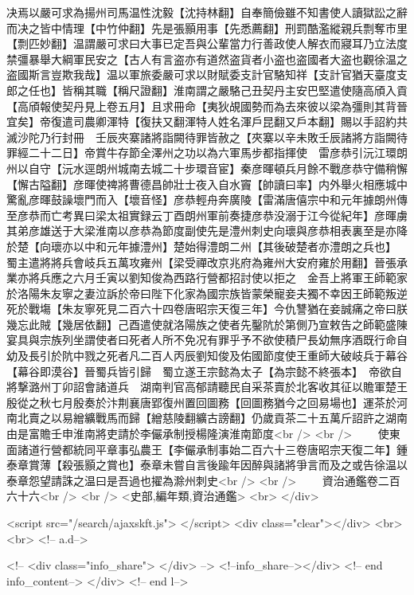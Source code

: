决焉以嚴可求為揚州司馬温性沈毅【沈持林翻】自奉簡儉雖不知書使人讀獄訟之辭而决之皆中情理【中竹仲翻】先是張顥用事【先悉薦翻】刑罰酷濫縱親兵剽奪市里【剽匹妙翻】温謂嚴可求曰大事已定吾與公輩當力行善政使人解衣而寢耳乃立法度禁彊暴舉大綱軍民安之【古人有言盗亦有道然盗貨者小盗也盗國者大盗也觀徐温之盗國斯言豈欺我哉】温以軍旅委嚴可求以財賦委支計官駱知祥【支計官猶天臺度支郎之任也】皆稱其職【稱尺證翻】淮南謂之嚴駱己丑契丹主安巴堅遣使隨高頎入貢【高頎報使契丹見上卷五月】且求冊命【夷狄覘國勢而為去來彼以梁為彊則其背晉宜矣】帝復遣司農卿渾特【復扶又翻渾特人姓名渾戶昆翻又戶本翻】賜以手詔約共滅沙陀乃行封冊　壬辰夾寨諸將詣闕待罪皆赦之【夾寨以辛未敗壬辰諸將方詣闕待罪經二十二日】帝賞牛存節全澤州之功以為六軍馬步都指揮使　雷彦恭引沅江環朗州以自守【沅水逕朗州城南去城二十步環音宦】秦彦暉頓兵月餘不戰彦恭守備稍懈【懈古隘翻】彦暉使禆將曹德昌帥壯士夜入自水竇【帥讀曰率】内外舉火相應城中驚亂彦暉鼓譟壞門而入【壞音怪】彦恭輕舟奔廣陵【雷滿唐僖宗中和元年據朗州傳至彦恭而亡考異曰梁太祖實録云丁酉朗州軍前奏捷彦恭没溺于江今從紀年】彦暉虜其弟彦雄送于大梁淮南以彦恭為節度副使先是澧州刺史向瓌與彦恭相表裏至是亦降於楚【向瓌亦以中和元年據澧州】楚始得澧朗二州【其後破楚者亦澧朗之兵也】　蜀主遣將將兵會岐兵五萬攻雍州【梁受禪改京兆府為雍州大安府雍於用翻】晉張承業亦將兵應之六月壬寅以劉知俊為西路行營都招討使以拒之　金吾上將軍王師範家於洛陽朱友寧之妻泣訴於帝曰陛下化家為國宗族皆蒙榮寵妾夫獨不幸因王師範叛逆死於戰塲【朱友寧死見二百六十四卷唐昭宗天復三年】今仇讐猶在妾誠痛之帝曰朕幾忘此賊【幾居依翻】己酉遣使就洛陽族之使者先鑿阬於第側乃宣敕告之師範盛陳宴具與宗族列坐謂使者曰死者人所不免况有罪乎予不欲使積尸長幼無序酒既行命自幼及長引於阬中戮之死者凡二百人丙辰劉知俊及佑國節度使王重師大破岐兵于幕谷【幕谷即漠谷】晉蜀兵皆引歸　蜀立遂王宗懿為太子【為宗懿不終張本】　帝欲自將撃潞州丁卯詔會諸道兵　湖南判官高郁請聽民自采茶賣於北客收其征以贍軍楚王殷從之秋七月殷奏於汴荆襄唐郢復州置回圖務【回圖務猶今之回易場也】運茶於河南北賣之以易繒纊戰馬而歸【繒慈陵翻纊古謗翻】仍歲貢茶二十五萬斤詔許之湖南由是富贍壬申淮南將吏請於李儼承制授楊隆演淮南節度<br />
<br />
　　使東面諸道行營都統同平章事弘農王【李儼承制事始二百六十三卷唐昭宗天復二年】鍾泰章賞薄【殺張顥之賞也】泰章未嘗自言後踰年因醉與諸將爭言而及之或告徐温以泰章怨望請誅之温曰是吾過也擢為滁州刺史<br />
<br />
　　資治通鑑卷二百六十六<br />
<br />
<史部,編年類,資治通鑑>  <br>
   </div> 

<script src="/search/ajaxskft.js"> </script>
 <div class="clear"></div>
<br>
<br>
 <!-- a.d-->

 <!--
<div class="info_share">
</div> 
-->
 <!--info_share--></div>   <!-- end info_content-->
  </div> <!-- end l-->

